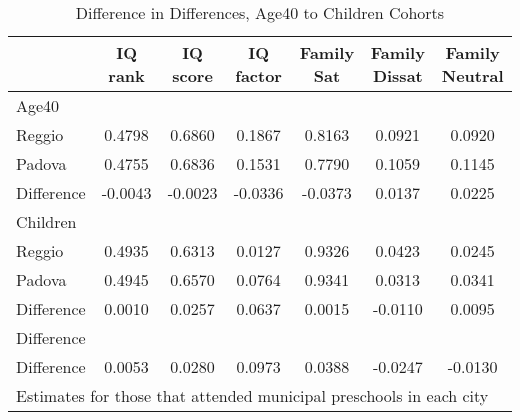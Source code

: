 \begin{table}[htbp]\centering
\caption{Difference in Differences, Age40 to Children Cohorts}
\begin{tabular}{l*{6}{c}}
\hline\hline
            &     IQ rank&    IQ score&   IQ factor&  Family Sat&Family Dissat&Family Neutral\\
\hline
Age40       &            &            &            &            &            &            \\
Reggio      &      0.4798&      0.6860&      0.1867&      0.8163&      0.0921&      0.0920\\
Padova      &      0.4755&      0.6836&      0.1531&      0.7790&      0.1059&      0.1145\\
Difference  &     -0.0043&     -0.0023&     -0.0336&     -0.0373&      0.0137&      0.0225\\
\hline
Children    &            &            &            &            &            &            \\
Reggio      &      0.4935&      0.6313&      0.0127&      0.9326&      0.0423&      0.0245\\
Padova      &      0.4945&      0.6570&      0.0764&      0.9341&      0.0313&      0.0341\\
Difference  &      0.0010&      0.0257&      0.0637&      0.0015&     -0.0110&      0.0095\\
\hline
Difference  &            &            &            &            &            &            \\
Difference  &      0.0053&      0.0280&      0.0973&      0.0388&     -0.0247&     -0.0130\\
\hline\hline
\multicolumn{7}{l}{\footnotesize Estimates for those that attended municipal preschools in each city}\\
\end{tabular}
\end{table}
